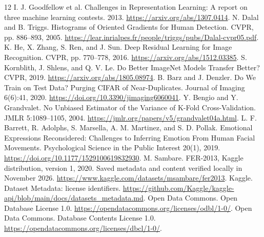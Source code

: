 \documentclass[11pt,a4paper]{article}
\begin{document}
\begingroup
\small
\setlength{\parskip}{0pt}
\begin{thebibliography}{12}
\setlength{\itemsep}{3pt}
 I. J. Goodfellow et al. Challenges in Representation Learning:
A report on three machine learning contests. 2013.
\url{https://arxiv.org/abs/1307.0414}.
 N. Dalal and B. Triggs. Histograms of Oriented Gradients for Human
Detection. CVPR, pp. 886--893, 2005.
\url{https://lear.inrialpes.fr/people/triggs/pubs/Dalal-cvpr05.pdf}.
 K. He, X. Zhang, S. Ren, and J. Sun. Deep Residual Learning for
Image Recognition. CVPR, pp. 770--778, 2016.
\url{https://arxiv.org/abs/1512.03385}.
 S. Kornblith, J. Shlens, and Q. V. Le. Do Better ImageNet
Models Transfer Better? CVPR, 2019. \url{https://arxiv.org/abs/1805.08974}.
 B. Barz and J. Denzler. Do We Train on Test Data? Purging
CIFAR of Near-Duplicates. Journal of Imaging 6(6):41, 2020.
\url{https://doi.org/10.3390/jimaging6060041}.
 Y. Bengio and Y. Grandvalet. No Unbiased Estimator of the
Variance of K-Fold Cross-Validation. JMLR 5:1089--1105, 2004.
\url{https://jmlr.org/papers/v5/grandvalet04a.html}.
 L. F. Barrett, R. Adolphs, S. Marsella, A. M. Martinez, and
S. D. Pollak. Emotional Expressions Reconsidered: Challenges to Inferring Emotion
From Human Facial Movements. Psychological Science in the Public Interest
20(1), 2019. \url{https://doi.org/10.1177/1529100619832930}.
 M. Sambare. FER-2013, Kaggle distribution, version 1, 2020.
Saved metadata and content verified locally in November 2026.
\url{https://www.kaggle.com/datasets/msambare/fer2013}.
 Kaggle. Dataset Metadata: license identifiers.
\url{https://github.com/Kaggle/kaggle-api/blob/main/docs/datasets_metadata.md}.
 Open Data Commons. Open Database License 1.0.
\url{https://opendatacommons.org/licenses/odbl/1-0/}.
 Open Data Commons. Database Contents License 1.0.
\url{https://opendatacommons.org/licenses/dbcl/1-0/}.
\end{thebibliography}
\endgroup
\end{document}
